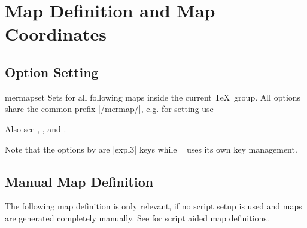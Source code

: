 \clearpage
\section{Map Definition and Map Coordinates}\label{sec:map_definition}%

%
\begin{dispExample}
\end{dispExample}

\subsection{Option Setting}
\begin{docCommand}{mermapset}{}
  Sets  for all following maps inside the current \TeX\ group.
  All options share the common prefix |/mermap/|, e.g. for setting
   use
  \begin{dispListing}
  \end{dispListing}
  Also see  , ,
  and .\par
  Note that the options by  are |expl3| \cite{package:expl3}
  keys while \tikzname\ \cite{package:tikz} uses its own key management.
\end{docCommand}


\clearpage
\subsection{Manual Map Definition}
The following map definition is only relevant, if no script setup is used
and maps are generated completely manually.
See  for script aided map definitions.

